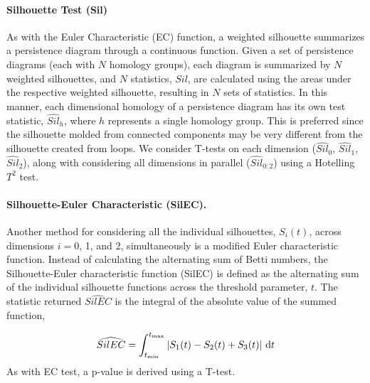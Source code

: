 \documentclass[12pt]{article}
\begin{document}

\paragraph{Silhouette Test (Sil)}
As with the Euler Characteristic (EC) function, a weighted silhouette summarizes a persistence diagram through a continuous function. Given a set of persistence diagrams (each with $N$ homology groups), each diagram is summarized by $N$ weighted silhouettes, and $N$ statistics, $\widehat{Sil}$, are calculated using the areas under the respective weighted silhouette, resulting in $N$ sets of statistics. In this manner,  each dimensional homology of a persistence diagram has its own test statistic, $\widehat{Sil}_{h}$, where $h$ represents a single homology group. This is preferred since the silhouette molded from connected components may be very different from the silhouette created from loops. We consider T-tests on each dimension ($\widehat{Sil}_0$, $\widehat{Sil}_1$, $\widehat{Sil}_2$), along with considering all dimensions in parallel ($\widehat{Sil}_{0:2}$) using a Hotelling $T^2$ test. 

\paragraph{Silhouette-Euler Characteristic (SilEC).}
Another method for considering all the individual silhouettes, $S_{i}(t)$, across dimensions $i = 0$, 1, and 2, simultaneously is a modified Euler characteristic function. Instead of calculating the alternating sum of Betti numbers, the Silhouette-Euler characteristic function (SilEC) is defined as the alternating sum of the individual silhouette functions across the threshold parameter, $t$. The statistic returned $\widehat{SilEC}$ is the integral of the absolute value of the summed function,  

\[ \widehat{SilEC} = \int_{t_{\min}}^{t_{\max}} | S_{1}(t) - S_{2}(t) + S_{3}(t) | \ \textup{d}t \]
As with EC test, a p-value is derived using a T-test.
\end{document}
